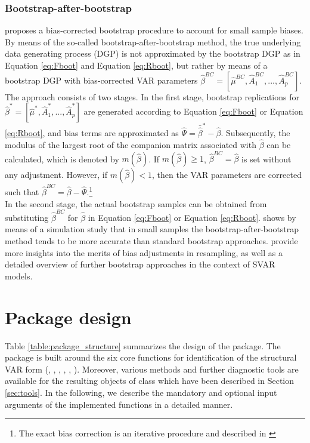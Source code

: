 \documentclass[nojss]{jss}\usepackage[]{graphicx}\usepackage[]{color}
\begin{document}
\subsubsection*{Bootstrap-after-bootstrap}\label{sec:baboot}
\cite{Kilian1998} proposes a bias-corrected bootstrap procedure to account for small sample biases. By means of the so-called bootstrap-after-bootstrap method, the true underlying data generating process (DGP) is not approximated by the bootstrap DGP as in Equation \ref{eq:Fboot} and Equation \ref{eq:Rboot}, but rather by means of a bootstrap DGP with bias-corrected VAR parameters $\widehat{\beta}^{BC} = [\widehat{\mu}^{BC}, \widehat{A}^{BC}_1, ..., \widehat{A}^{BC}_p]$. \\
The approach consists of two stages. In the first stage, bootstrap replications for $\widehat{\beta}^* = [\widehat{\mu}^{*}, \widehat{A}^{*}_1, ..., \widehat{A}^{*}_p]$ are generated according to Equation \ref{eq:Fboot} or Equation \ref{eq:Rboot}, and  bias terms are approximated as $\widehat{\Psi} = \bar{\widehat{\beta}}^* - \widehat{\beta}$. Subsequently, the modulus of the largest root of the companion matrix associated with $\widehat{\beta}$ can be calculated, which is denoted by $m(\widehat{\beta})$. If $m(\widehat{\beta}) \geq 1$, $\widehat{\beta}^{BC} = \widehat{\beta}$ is set without any adjustment. However, if $m(\widehat{\beta}) < 1$, then the VAR parameters are corrected such that $\widehat{\beta}^{BC} = \widehat{\beta} - \widehat{\Psi}$.\footnote{The exact bias correction is an iterative procedure and described in \cite{Kilian1998}}\\
In the second stage, the actual bootstrap samples can be obtained from substituting $\widehat{\beta}^{BC}$ for $\widehat{\beta}$ in Equation \ref{eq:Fboot} or Equation \ref{eq:Rboot}. \cite{Kilian1998} shows by means of a simulation study that in small samples the bootstrap-after-bootstrap method tends to be more accurate than standard bootstrap approaches.
\cite{LK17} provide more insights into the merits of bias adjustments in resampling, as well as a detailed  overview of further bootstrap approaches in the context of SVAR models.


\section{Package design}\label{sec:pkg_structure}

Table \ref{table:package_structure} summarizes the design of the  package. The package is built around the six core functions for identification of the structural VAR form (, , , , , ). Moreover, various methods and further diagnostic tools are available for the resulting objects of class  which have been described in Section \ref{sec:tools}. In the following, we describe the mandatory and optional input arguments of the implemented functions in a detailed manner.
\end{document}
